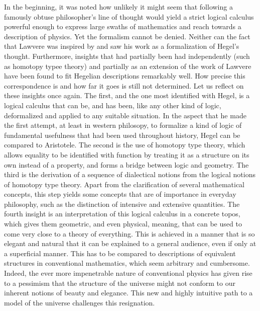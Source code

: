 \documentclass{article}
\begin{document}
In the beginning, it was noted how unlikely it might seem that following a famously obtuse philosopher's line of thought would yield a strict logical calculus powerful enough to express large swaths of mathematics and reach towards a description of physics. Yet the formalism cannot be denied. Neither can the fact that Lawvere was inspired by and saw his work as a formalization of Hegel's thought. Furthermore, insights that had partially been had independently (such as homotopy typee theory) and partially as an extension of the work of Lawvere have been found to fit Hegelian descriptions remarkably well. How precise this correspondence is and how far it goes is still not determined. Let us reflect on these insights once again. The first, and the one most identified with Hegel, is a logical calculus that can be, and has been, like any other kind of logic, deformalized and applied to any suitable situation. In the aspect that he made the first attempt, at least in western philosopy, to formalize a kind of logic of fundamental usefulness that had been used throughout history, Hegel can be compared to Aristotele. The second is the use of homotopy type theory, which allows equality to be identified with function by treating it as a structure on its own instead of a property, and forms a bridge between logic and geometry. The third is the derivation of a sequence of dialectical notions from the logical notions of homotopy type theory. Apart from the clarification of several mathematical concepts, this step yields some concepts that are of importance in everyday philosophy, such as the distinction of intensive and extensive quantities. The fourth insight is an interpretation of this logical calculus in a concrete topos, which gives them geometric, and even physical, meaning, that can be used to come very close to a theory of everything. This is achieved in a manner that is so elegant and natural that it can be explained to a general audience, even if only at a superficial manner. This has to be compared to descriptions of equivalent structures in conventional mathematics, which seem arbitrary and cumbersome. Indeed, the ever more impenetrable nature of conventional physics has given rise to a pessimism that the structure of the universe might not conform to our inherent notions of beauty and elegance. This new and highly intuitive path to a model of the universe challenges this resignation. \\
\end{document}
